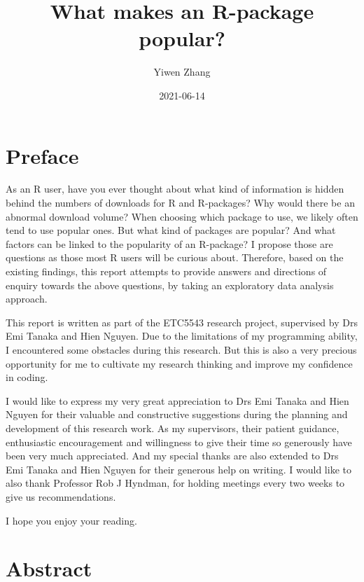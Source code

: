 \documentclass[
]{book}
\title{What makes an R-package popular?}
\author{Yiwen Zhang}
\date{2021-06-14}
\begin{document}
\maketitle

{
\setcounter{tocdepth}{1}
\tableofcontents
}
\hypertarget{preface}{%
\chapter*{Preface}\label{preface}}

As an R user, have you ever thought about what kind of information is hidden behind the numbers of downloads for R and R-packages? Why would there be an abnormal download volume? When choosing which package to use, we likely often tend to use popular ones. But what kind of packages are popular? And what factors can be linked to the popularity of an R-package? I propose those are questions as those most R users will be curious about. Therefore, based on the existing findings, this report attempts to provide answers and directions of enquiry towards the above questions, by taking an exploratory data analysis approach.

This report is written as part of the ETC5543 research project, supervised by Drs Emi Tanaka and Hien Nguyen. Due to the limitations of my programming ability, I encountered some obstacles during this research. But this is also a very precious opportunity for me to cultivate my research thinking and improve my confidence in coding.

I would like to express my very great appreciation to Drs Emi Tanaka and Hien Nguyen for their valuable and constructive suggestions during the planning and development of this research work. As my supervisors, their patient guidance, enthusiastic encouragement and willingness to give their time so generously have been very much appreciated. And my special thanks are also extended to Drs Emi Tanaka and Hien Nguyen for their generous help on writing. I would like to also thank Professor Rob J Hyndman, for holding meetings every two weeks to give us recommendations.

I hope you enjoy your reading.

\hypertarget{abstract}{%
\chapter{Abstract}\label{abstract}}
\end{document}
